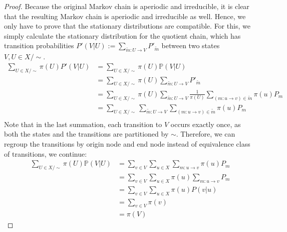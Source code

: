 \documentclass{article}
\theoremstyle{definition}
\newcommand{\PP}{\mathbb{P}}
\begin{document}
\begin{proof}
    Because the original Markov chain is aperiodic and irreducible, it is clear that the resulting Markov chain is aperiodic and irreducible as well. Hence, we only have to prove that the stationary distributions are compatible. For this, we simply calculate the stationary distribution for the quotient chain, which has transition probabilities $P'(V|U) := \sum_{\widetilde{m}: U \to V} P'_{\widetilde{m}}$ between two states $V,U\in X/\sim$.
    \begin{align*}
        \sum_{U\in X/\sim} \pi(U) P'(V|U) 
            &= \sum_{U\in X/\sim} \pi(U) \PP(V|U) \\
            &= \sum_{U\in X/\sim} \pi(U) \sum_{\widetilde{m}: U\to V} P'_{\widetilde{m}} \\
            &= \sum_{U\in X/\sim} \pi(U) \sum_{\widetilde{m}: U\to V} \frac{1}{\pi(U)} \sum_{(m:u\to v)\in\widetilde{m}}\pi(u) P_m \\
            &= \sum_{U\in X/\sim} \sum_{\widetilde{m}: U\to V} \sum_{(m:u\to v)\in\widetilde{m}}\pi(u) P_m \\     
    \end{align*}
    Note that in the last summation, each transition to $V$ occurs exactly once, as both the states and the transitions are partitioned by $\sim$. Therefore, we can regroup the transitions by origin node and end node instead of equivalence class of transitions, we continue:
    \begin{align*}
        \sum_{U\in X/\sim} \pi(U) \PP(V|U) 
            &= \sum_{v\in V} \sum_{u \in X} \sum_{m:u\to v}\pi(u) P_m \\
            &= \sum_{v\in V} \sum_{u \in X} \pi(u) \sum_{m:u\to v} P_m \\
            &= \sum_{v\in V} \sum_{u \in X} \pi(u) P(v | u) \\
            &= \sum_{v\in V} \pi (v) \\
            &= \pi(V)
    \end{align*}

\end{proof}
\end{document}
